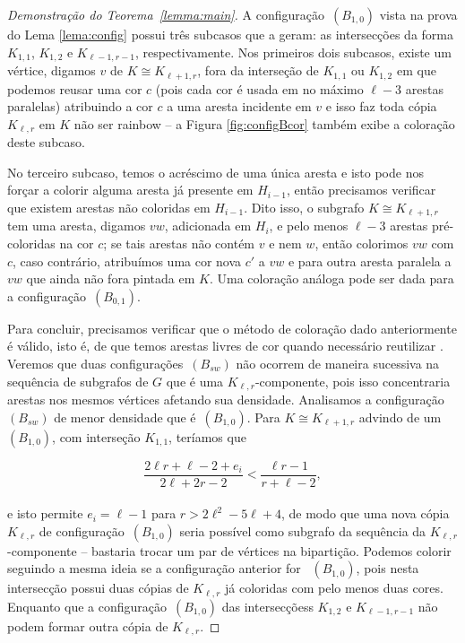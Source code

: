\documentclass[12pt,a4paper]{book}
\newcommand{\K}{K_{\ell,r}} %
\begin{document}
\begin{proof}[Demonstração do Teorema~\ref{lemma:main}]
       A configuração~\hyperref[configB]{$(B_{1,0})$} vista na prova do Lema \ref{lema:config} possui três subcasos que a geram: 
       as intersecções da forma $K_{1,1}$, $K_{1,2}$ e $K_{\ell-1,r-1}$, respectivamente. 
       Nos primeiros dois subcasos, existe um vértice, digamos $v$ de $K \cong K_{\ell+1,r}$,
        fora da interseção de $K_{1,1}$ ou $K_{1,2}$ em que podemos reusar uma
        cor $c$ (pois cada cor é usada em no máximo $\ell-3$ arestas paralelas) atribuindo a cor $c$ a uma aresta incidente em $v$ e isso faz toda cópia $\K$ em $K$ não ser rainbow -- a Figura \ref{fig:configBcor} também exibe a coloração deste subcaso.
                
        No terceiro subcaso, temos o acréscimo de uma única aresta e isto pode nos forçar a colorir alguma aresta já presente em $H_{i-1}$, então precisamos verificar que existem arestas não coloridas em $H_{i-1}$. 
        Dito isso, o subgrafo $K \cong K_{\ell+1,r}$ tem uma aresta, digamos $vw$, adicionada em $H_i$, e pelo menos $\ell-3$ arestas pré-coloridas na cor $c$;
        se tais arestas não contém $v$ e nem $w$, então colorimos $vw$ com $c$, caso contrário, atribuímos uma cor nova $c'$ a $vw$ e para outra aresta paralela a $vw$ que ainda não fora pintada em $K$.  
        Uma coloração análoga pode ser dada para a configuração~\hyperref[configB]{$(B_{0,1})$}.
        
        Para concluir, precisamos verificar que o método de coloração dado anteriormente é válido, isto é, de que temos arestas livres de cor quando necessário reutilizar .
        Veremos que duas configurações~\hyperref[configB]{$(B_{sw})$} não ocorrem de maneira sucessiva na sequência de subgrafos  de $G$ que é uma $\K$-componente, pois isso concentraria arestas nos mesmos vértices afetando sua densidade. %
        Analisamos a configuração~\hyperref[configB]{$(B_{sw})$} de menor densidade que é~\hyperref[configB]{$(B_{1,0})$}.
        Para $K \cong K_{\ell+1,r}$ advindo de um~\hyperref[configB]{$(B_{1,0})$}, com interseção $K_{1,1}$, teríamos que 
        
        \[
            \frac{2\ell r+\ell-2+e_i}{2\ell+2r-2} < \frac{\ell
r-1}{r+\ell-2},
        \]
        \\
        e isto permite $e_i = \ell-1$ para $r > 2\ell^2-5\ell+4$,
        de modo que uma nova cópia $\K$ de configuração~\hyperref[configB]{$(B_{1,0})$} seria possível como subgrafo da sequência da $\K$-componente -- bastaria trocar um par de vértices na bipartição.
         Podemos colorir seguindo a mesma ideia se a configuração anterior for ~\hyperref[configB]{$(B_{1,0})$}, pois nesta intersecção possui duas cópias de $\K$ já coloridas com pelo menos duas cores.
        Enquanto que a configuração~\hyperref[configB]{$(B_{1,0})$}
 das intersecçõess $K_{1,2}$ e $K_{\ell-1,r-1}$ não podem formar outra cópia de $\K$.  


\end{proof}
\end{document}
